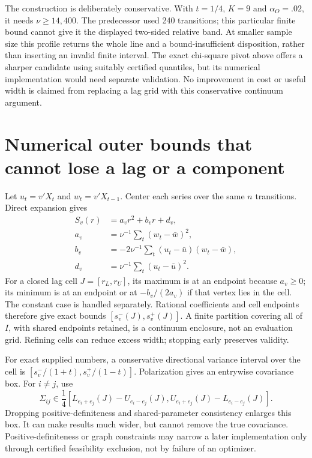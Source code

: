 The construction is deliberately conservative. With \(t=1/4\), \(K=9\)
and \(\alpha_O=.02\), it needs \(\nu\ge14{,}400\). The predecessor used
240 transitions; this particular finite bound cannot give it the
displayed two-sided relative band. At smaller sample size this profile
returns the whole line and a bound-insufficient disposition, rather than
inserting an invalid finite interval. The exact chi-square pivot above
offers a sharper candidate using suitably certified quantiles, but its
numerical implementation would need separate validation. No improvement
in cost or useful width is claimed from replacing a lag grid with this
conservative continuum argument.

\hypertarget{numerical-outer-bounds-that-cannot-lose-a-lag-or-a-component}{%
\section{Numerical outer bounds that cannot lose a lag or a
component}\label{numerical-outer-bounds-that-cannot-lose-a-lag-or-a-component}}

Let \(u_t=v'X_t\) and \(w_t=v'X_{t-1}\). Center each series over the
same \(n\) transitions. Direct expansion gives \[
 \begin{aligned}
 S_v(r)&=a_vr^2+b_vr+d_v,\\
 a_v&=\nu^{-1}\sum_t(w_t-\bar w)^2,\\
 b_v&=-2\nu^{-1}\sum_t(u_t-\bar u)(w_t-\bar w),\\
 d_v&=\nu^{-1}\sum_t(u_t-\bar u)^2.
 \end{aligned}
\] For a closed lag cell \(J=[r_L,r_U]\), its maximum is at an endpoint
because \(a_v\ge0\); its minimum is at an endpoint or at \(-b_v/(2a_v)\)
if that vertex lies in the cell. The constant case is handled
separately. Rational coefficients and cell endpoints therefore give
exact bounds \([s^-_v(J),s^+_v(J)]\). A finite partition covering all of
\(I\), with shared endpoints retained, is a continuum enclosure, not an
evaluation grid. Refining cells can reduce excess width; stopping early
preserves validity.

For exact supplied numbers, a conservative directional variance interval
over the cell is \([s^-_v/(1+t),s^+_v/(1-t)]\). Polarization gives an
entrywise covariance box. For \(i\ne j\), use \[
 \Sigma_{ij}\in\frac14
 [L_{e_i+e_j}(J)-U_{e_i-e_j}(J),
  U_{e_i+e_j}(J)-L_{e_i-e_j}(J)].
\] Dropping positive-definiteness and shared-parameter consistency
enlarges this box. It can make results much wider, but cannot remove the
true covariance. Positive-definiteness or graph constraints may narrow a
later implementation only through certified feasibility exclusion, not
by failure of an optimizer.


